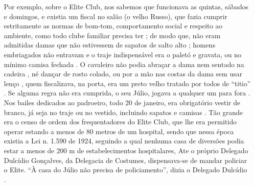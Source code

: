 
Por exemplo, sobre o Elite Club,  nos sabemos que funcionava as quintas, sábados e domingos,
e existia um fiscal no salão (o velho Russo)\cite[pp. 37]{gafieirajournalmanchete}, 
que fazia cumprir estritamente as normas de bom-tom, comportamento social e respeito ao ambiente, como todo clube familiar precisa ter \cite[pp. 12]{respeitojournalbrasil1}; de modo que, 
não eram admitidas damas que não estivessem de sapatos de salto alto \cite[pp. 37]{gafieirajournalmanchete};
homens embriagados não entravam e o traje indispensável era o paletó e gravata, 
ou no mínimo camisa fechada \cite[pp. 6 - cad. B]{entrevistajuliojournalbrasil1}.
O cavaleiro não podia abraçar a dama nem sentado na cadeira \cite[pp. 6 - cad. B]{entrevistajuliojournalbrasil1},
né dançar de rosto colado, ou por a mão nas costas da dama sem usar lenço \cite[pp. 10]{simoesjournalbrasil1}, 
quem fiscalizava, na porta, era um preto velho tratado por todos de ``titio''  \cite[pp. 37]{gafieirajournalmanchete}.
Se alguma regra não era cumprida, o seu Júlio, jogava a qualquer um para fora \cite[pp. 6 - cad. B]{entrevistajuliojournalbrasil1}.
Nos bailes dedicados ao padroeiro, todo 20 de janeiro, era obrigatório vestir de branco,
já seja no traje ou no vestido, incluindo sapatos e camisas \cite[pp. 37]{gafieirajournalmanchete}.
Tão grande era o censo de ordem dos frequentadores do Elite Club, 
que lhe era permitido operar estando a menos de 80 metros de um hospital,
sendo que nessa época existia a Lei n. 1.590 de 1924, 
seguindo a qual nenhuma casa de diversões podia estar a menos de 200 m de estabelecimentos hospitalares,
Ate o próprio Delegado Dulcídio Gonçalves, da Delegacia de Costumes,
dispensava-se de mandar policiar o Elite.
``À casa do Júlio não precisa de policiamento'', dizia o Delegado Dulcídio
\cite[pp. 5]{simoesjournalalutademocratica1}.


